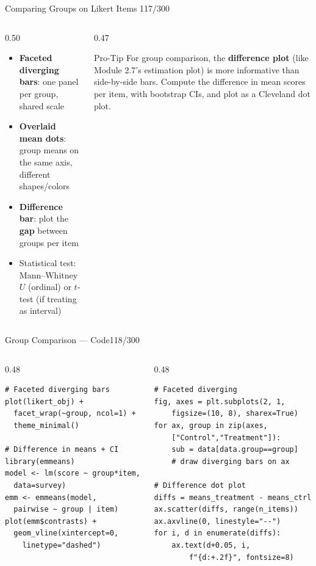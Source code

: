 \documentclass[10pt]{beamer}
\newcommand{\smark}[1]{\hfill{\scriptsize\color{codegray}#1}}
\begin{document}
\begin{frame}{Comparing Groups on Likert Items}
\smark{117/300}
\begin{columns}[T]
\begin{column}{0.50\textwidth}
\begin{itemize}
    \item \textbf{Faceted diverging bars}: one panel per group, shared scale
    \item \textbf{Overlaid mean dots}: group means on the same axis, different shapes/colors
    \item \textbf{Difference bar}: plot the \textbf{gap} between groups per item
    \item Statistical test: Mann--Whitney $U$ (ordinal) or $t$-test (if treating as interval)
\end{itemize}
\end{column}
\begin{column}{0.47\textwidth}
\begin{alertblock}{Pro-Tip}
    \scriptsize For group comparison, the \textbf{difference plot} (like Module 2.7's estimation plot) is more informative than side-by-side bars. Compute the difference in mean scores per item, with bootstrap CIs, and plot as a Cleveland dot plot.
\end{alertblock}
\end{column}
\end{columns}
\end{frame}

\begin{frame}[fragile]{Group Comparison --- Code}\smark{118/300}
\begin{columns}[T]
\begin{column}{0.48\textwidth}
\begin{lstlisting}[style=Rstyle]
# Faceted diverging bars
plot(likert_obj) +
  facet_wrap(~group, ncol=1) +
  theme_minimal()

# Difference in means + CI
library(emmeans)
model <- lm(score ~ group*item,
  data=survey)
emm <- emmeans(model,
  pairwise ~ group | item)
plot(emm$contrasts) +
  geom_vline(xintercept=0,
    linetype="dashed")
\end{lstlisting}
\end{column}
\begin{column}{0.48\textwidth}
\begin{lstlisting}[style=Pystyle]
# Faceted diverging
fig, axes = plt.subplots(2, 1,
    figsize=(10, 8), sharex=True)
for ax, group in zip(axes,
    ["Control","Treatment"]):
    sub = data[data.group==group]
    # draw diverging bars on ax

# Difference dot plot
diffs = means_treatment - means_ctrl
ax.scatter(diffs, range(n_items))
ax.axvline(0, linestyle="--")
for i, d in enumerate(diffs):
    ax.text(d+0.05, i,
        f"{d:+.2f}", fontsize=8)
\end{lstlisting}
\end{column}
\end{columns}
\end{frame}
\end{document}
